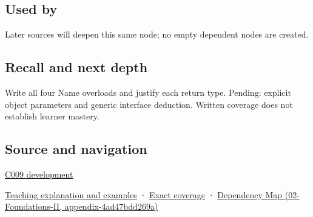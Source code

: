 \subsection{Used by}\label{appendix-d42039b1d6f7-used-by}

Later sources will deepen this same node; no empty dependent nodes are created.

\subsection{Recall and next depth}\label{appendix-d42039b1d6f7-recall-and-next-depth}

Write all four Name overloads and justify each return type. Pending: explicit object parameters and generic interface deduction. Written coverage does not establish learner mastery.

\subsection{Source and navigation}\label{appendix-d42039b1d6f7-source-and-navigation}

\hyperref[appendix-fd090d982a15-m009---parts-127-147]{C009 development}

\hyperref[01-foundations-i-ch003-an-accessor-must-respect-the-callers-lifetime]{Teaching explanation and examples} · \hyperref[appendix-fd090d982a15-m008---parts-113-126]{Exact coverage} · \href{../02-Foundations-II/main.pdf\#nameddest=appendix-4ad47bdd269a}{Dependency Map (02-Foundations-II, appendix-4ad47bdd269a)}
